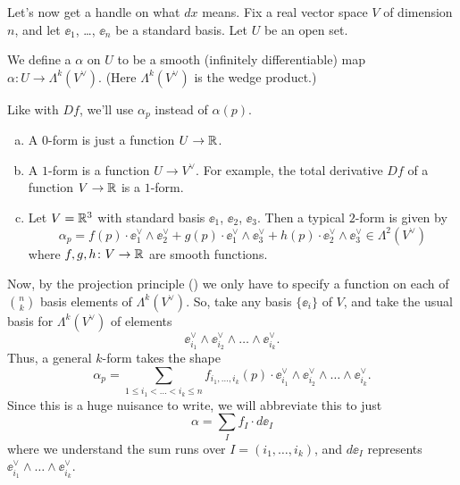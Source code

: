 Let's now get a handle on what $dx$ means.
Fix a real vector space $V$ of dimension $n$,
and let $\ee_1$, \dots, $\ee_n$ be a standard basis.
Let $U$ be an open set.

\begin{definition}
	We define a  $\alpha$ on $U$
	to be a smooth (infinitely differentiable) map
	$\alpha \colon U \to \Lambda^k(V^\vee)$.
	(Here $\Lambda^k(V^\vee)$ is the wedge product.)
\end{definition}

Like with $Df$, we'll use $\alpha_p$ instead of $\alpha(p)$.

\begin{example}
	[$k$-forms for $k=0,1$]
	\listhack
	\begin{enumerate}[(a)]
		\item A $0$-form is just a function $U \to \mathbb R$.
		\item A $1$-form is a function $U \to V^\vee$.
		For example,
		the total derivative $Df$ of a function $V \to \mathbb R$ is a $1$-form.
		\item Let $V = \mathbb R^3$ with standard basis $\ee_1$, $\ee_2$, $\ee_3$.
		Then a typical $2$-form is given by
		\[
			\alpha_p
			=
			f(p) \cdot \ee_1^\vee \wedge \ee_2^\vee
			+ g(p) \cdot \ee_1^\vee \wedge \ee_3^\vee
			+ h(p) \cdot \ee_2^\vee \wedge \ee_3^\vee
			\in \Lambda^2(V^\vee)
		\]
		where $f,g,h \colon V \to \mathbb R$ are smooth functions.
	\end{enumerate}
\end{example}

Now, by the projection principle () we only have to specify
a function on each of $\binom nk$ basis elements of $\Lambda^k(V^\vee)$.
So, take any basis $\{\ee_i\}$ of $V$, and
take the usual basis for $\Lambda^k(V^\vee)$ of elements
\[ \ee_{i_1}^\vee \wedge \ee_{i_2}^\vee \wedge \dots \wedge \ee_{i_k}^\vee. \]
Thus, a general $k$-form takes the shape
\[ \alpha_p = \sum_{1 \le i_1 < \dots < i_k \le n}
	f_{i_1, \dots, i_k}(p) \cdot
	\ee_{i_1}^\vee \wedge \ee_{i_2}^\vee \wedge \dots \wedge \ee_{i_k}^\vee. \]
Since this is a huge nuisance to write, we will abbreviate this to just
\[ \alpha = \sum_I f_I \cdot d\ee_I \]
where we understand the sum runs over $I = (i_1, \dots, i_k)$,
and $d\ee_I$ represents $\ee_{i_1}^\vee \wedge \dots \wedge \ee_{i_k}^\vee$.

